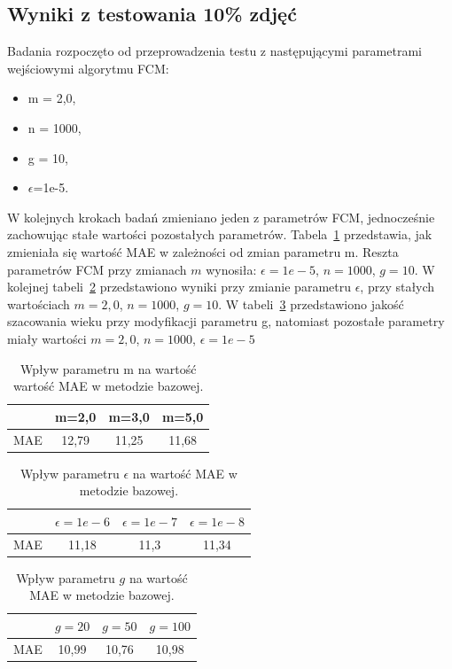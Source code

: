 \documentclass[a4paper,twoside,12pt]{book}
\begin{document}
    \subsection*{Wyniki z testowania 10\% zdjęć}
    Badania rozpoczęto od przeprowadzenia testu z następującymi parametrami wejściowymi algorytmu FCM:
    \begin{itemize}
        \item m = 2,0,
        \item n = 1000,
        \item g = 10,
        \item $\epsilon$=1e-5.
    \end{itemize}
    W kolejnych krokach badań zmieniano jeden z parametrów FCM, jednocześnie zachowując stałe wartości pozostałych
    parametrów.
    Tabela~\ref{tab.bazowa_m} przedstawia, jak zmieniała się wartość MAE w zależności od zmian parametru m. Reszta
    parametrów FCM przy zmianach $m$ wynosiła: $\epsilon=1e-5$, $n=1000$, $g=10$.
    W kolejnej tabeli~\ref{tab.bazowa_e} przedstawiono wyniki przy
    zmianie parametru $\epsilon$, przy stałych wartościach $m=2,0$, $n=1000$, $g=10$.
    W tabeli~\ref{tab.bazowa_g} przedstawiono
    jakość szacowania
    wieku przy modyfikacji parametru g, natomiast pozostałe parametry miały wartości $m=2,0$, $n=1000$, $\epsilon=1e-5$
    \begin{table}[]
        \centering
        \caption{Wpływ parametru m na wartość wartość MAE w metodzie bazowej.}
        \begin{tabular}{|c|c|c|c|}
            \hline
            & m=2,0 & m=3,0 & m=5,0 \\ \hline
            MAE & 12,79 & 11,25 & 11,68 \\ \hline
        \end{tabular}
        \label{tab.bazowa_m}
    \end{table}
    \begin{table}[]
        \centering
        \caption{Wpływ parametru $\epsilon$ na wartość MAE w metodzie bazowej.}
        \begin{tabular}{|c|c|c|c|}
            \hline
            & $\epsilon=1e-6$ & $\epsilon=1e-7$ & $\epsilon=1e-8$ \\ \hline
            MAE & 11,18 & 11,3 & 11,34 \\ \hline
        \end{tabular}
        \label{tab.bazowa_e}
    \end{table}
    \begin{table}[]
        \centering
        \caption{Wpływ parametru $g$ na wartość MAE w metodzie bazowej.}
        \begin{tabular}{|c|c|c|c|}
            \hline
            & $g=20$ & $g=50$ & $g=100$ \\ \hline
            MAE & 10,99 & 10,76 & 10,98 \\ \hline
        \end{tabular}
        \label{tab.bazowa_g}
    \end{table}
\end{document}
